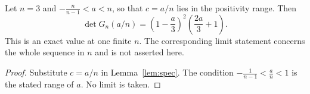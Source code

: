 \begin{theorem}\label{thm:main}
Let $n=3$ and $-\tfrac{n}{n-1}<a<n$, so that $c=a/n$ lies in the positivity range. Then
\[
\det G_n(a/n)=\left(1 - \frac{a}{3}\right)^{2} \left(\frac{2 a}{3} + 1\right).
\]
This is an exact value at one finite $n$. The corresponding limit statement concerns the whole sequence in $n$ and is not asserted here.
\end{theorem}
\begin{proof}
Substitute $c=a/n$ in Lemma~\ref{lem:spec}.
The condition $-\frac1{n-1}<\frac an<1$ is the stated range of $a$.
No limit is taken.
\end{proof}
